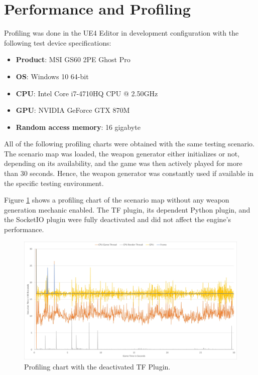 \documentclass[MGS,Master,english]{twbook}%
\begin{document}
\section{Performance and Profiling}
Profiling was done in the \ac{UE4} Editor in development configuration with the following test device specifications:
\begin{itemize}
	\item \textbf{Product}: MSI GS60 2PE Ghost Pro
	\item \textbf{\ac{OS}}: Windows 10 64-bit
	\item \textbf{\ac{CPU}}: Intel Core i7-4710HQ \ac{CPU} @ 2.50GHz
	\item \textbf{\ac{GPU}}: NVIDIA GeForce GTX 870M
	\item \textbf{Random access memory}: 16 gigabyte
\end{itemize}

All of the following profiling charts were obtained with the same testing scenario. The scenario map was loaded, the weapon generator either initializes or not, depending on its availability, and the game was then actively played for more than 30 seconds. Hence, the weapon generator was constantly used if available in the specific testing environment. 

Figure \ref{scenario::profiling_noTF} shows a profiling chart of the scenario map without any weapon generation mechanic enabled. The \ac{TF} plugin, its dependent Python plugin, and the SocketIO plugin were fully deactivated and did not affect the engine’s performance.
\begin{figure}[!ht]
	\centering
	\includegraphics[width=1.0\linewidth]{PICs/Profiling/deactivated_plugin}
	\caption{Profiling chart with the deactivated \ac{TF} Plugin.} \label{scenario::profiling_noTF}
\end{figure}
\end{document}
